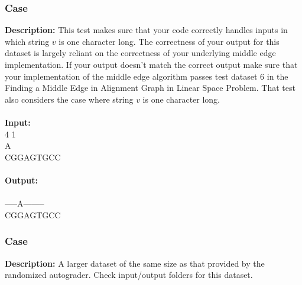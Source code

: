 \documentclass{article}
\newcommand{\code}[1]{{\fontfamily{pcr}\selectfont #1}}
\begin{document}
\subsubsection*{Case }
\hline \vspace{5}
\textbf{Description:} This test makes sure that your code correctly handles inputs in which string $v$ is one character long. The correctness of your output for this dataset is largely reliant on the correctness of your underlying middle edge implementation. If your output doesn’t match the correct output make sure that your implementation of the middle edge algorithm passes test dataset $6$ in the Finding a Middle Edge in Alignment Graph in Linear Space Problem. That test also considers the case where string $v$ is one character long.\\ \\
\noindent \textbf{Input:}\\
\code{3 4 1\\A\\CGGAGTGCC}\\ \\
\noindent \textbf{Output:}\\
\code{-5\\-----A--------\\CGGAGTGCC}

\subsubsection*{Case }
\hline \vspace{5}
\textbf{Description:} A larger dataset of the same size as that provided by the randomized autograder. Check input/output folders for this dataset.\\ \\
\pagebreak
\end{document}
